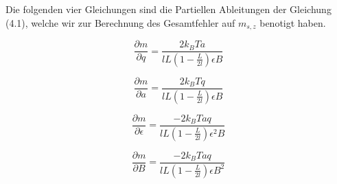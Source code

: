 \documentclass[a4paper,parskip,11pt, DIV12]{scrreprt}
\begin{document}
Die folgenden vier Gleichungen sind die Partiellen Ableitungen der Gleichung (4.1), welche wir zur Berechnung des Gesamtfehler auf $m_{s,z}$ benotigt haben.

\begin{equation}
\frac{\partial m}{\partial q} = \frac{2k_BTa}{lL(1-\frac{L}{2l})\epsilon B}
\end{equation}

\begin{equation}
\frac{\partial m}{\partial a} = \frac{2k_BTq}{lL(1-\frac{L}{2l})\epsilon B}
\end{equation}

\begin{equation}
\frac{\partial m}{\partial \epsilon} = \frac{-2k_BTaq}{lL(1-\frac{L}{2l})\epsilon^2 B}
\end{equation}

\begin{equation}
\frac{\partial m}{\partial B} = \frac{-2k_BTaq}{lL(1-\frac{L}{2l})\epsilon B^2}
\end{equation}


\clearpage
 

\end{document}
